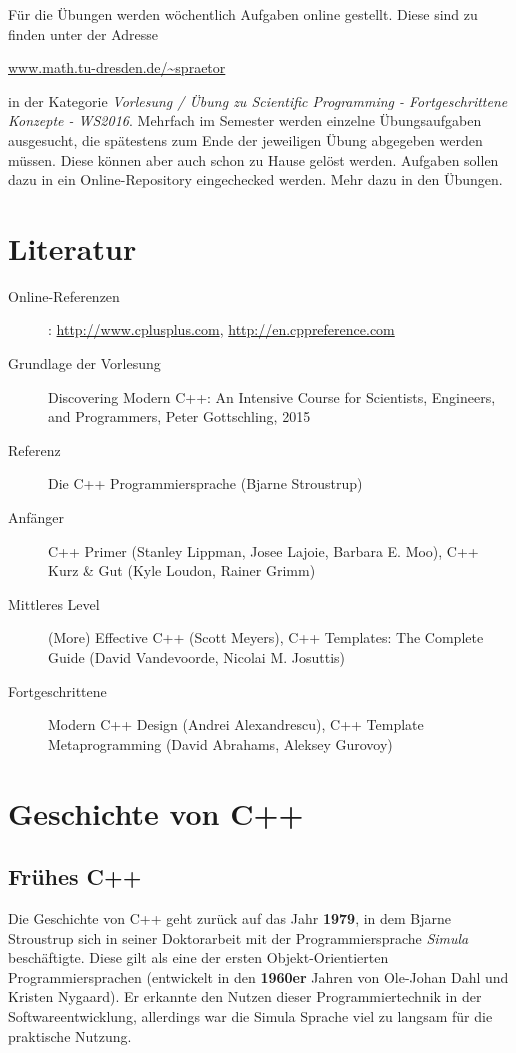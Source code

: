 Für die Übungen werden wöchentlich Aufgaben online gestellt. Diese sind zu finden unter der Adresse

\url{www.math.tu-dresden.de/~spraetor}

in der Kategorie \textit{Vorlesung / Übung zu Scientific Programming - Fortgeschrittene Konzepte - WS2016}. Mehrfach im Semester werden einzelne Übungsaufgaben ausgesucht, die spätestens zum Ende der jeweiligen Übung abgegeben werden müssen. Diese können aber auch schon zu Hause gelöst werden. Aufgaben sollen dazu in ein Online-Repository eingechecked werden. Mehr dazu in den Übungen.

\section{Literatur}
\begin{description}
\item[Online-Referenzen]: \url{http://www.cplusplus.com}, \url{http://en.cppreference.com}
\item[Grundlage der Vorlesung] Discovering Modern C++: An Intensive Course for Scientists, Engineers, and Programmers, Peter Gottschling, 2015
\item[Referenz] Die C++ Programmiersprache (Bjarne Stroustrup)
\item[Anfänger] C++ Primer (Stanley Lippman, Josee Lajoie, Barbara E. Moo), C++ Kurz \& Gut (Kyle Loudon, Rainer Grimm)
\item[Mittleres Level] (More) Effective C++ (Scott Meyers), C++ Templates: The Complete Guide (David Vandevoorde, Nicolai M. Josuttis)
\item[Fortgeschrittene] Modern C++ Design (Andrei Alexandrescu), C++ Template Metaprogramming (David Abrahams, Aleksey Gurovoy)
\end{description}

\section{Geschichte von C++}
\subsection{Frühes C++}
Die Geschichte von C++ geht zurück auf das Jahr \textbf{1979}, in dem Bjarne Stroustrup sich in seiner Doktorarbeit mit der Programmiersprache \textit{Simula} beschäftigte. Diese gilt als eine der ersten Objekt-Orientierten Programmiersprachen (entwickelt in den \textbf{1960er} Jahren von Ole-Johan Dahl und Kristen Nygaard). Er erkannte den Nutzen dieser Programmiertechnik in der Softwareentwicklung, allerdings war die Simula Sprache viel zu langsam für die praktische Nutzung.

